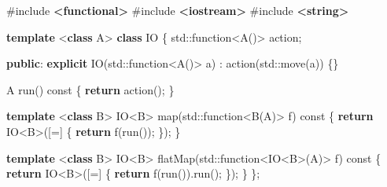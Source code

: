 \documentclass[]{article}
\newenvironment{Shaded}{}{}
\newcommand{\AttributeTok}[1]{\textcolor[rgb]{0.49,0.56,0.16}{#1}}
\newcommand{\BuiltInTok}[1]{\textcolor[rgb]{0.00,0.50,0.00}{#1}}
\newcommand{\ControlFlowTok}[1]{\textcolor[rgb]{0.00,0.44,0.13}{\textbf{#1}}}
\newcommand{\ImportTok}[1]{\textcolor[rgb]{0.00,0.50,0.00}{\textbf{#1}}}
\newcommand{\KeywordTok}[1]{\textcolor[rgb]{0.00,0.44,0.13}{\textbf{#1}}}
\newcommand{\NormalTok}[1]{#1}
\newcommand{\OperatorTok}[1]{\textcolor[rgb]{0.40,0.40,0.40}{#1}}
\newcommand{\PreprocessorTok}[1]{\textcolor[rgb]{0.74,0.48,0.00}{#1}}
\begin{document}
\begin{Shaded}
\begin{Highlighting}[]
\PreprocessorTok{\#include }\ImportTok{\textless{}functional\textgreater{}}
\PreprocessorTok{\#include }\ImportTok{\textless{}iostream\textgreater{}}
\PreprocessorTok{\#include }\ImportTok{\textless{}string\textgreater{}}

\KeywordTok{template} \OperatorTok{\textless{}}\KeywordTok{class}\NormalTok{ A}\OperatorTok{\textgreater{}}
\KeywordTok{class}\NormalTok{ IO }\OperatorTok{\{}
  \BuiltInTok{std::}\NormalTok{function}\OperatorTok{\textless{}}\NormalTok{A}\OperatorTok{()\textgreater{}}\NormalTok{ action}\OperatorTok{;}

\KeywordTok{public}\OperatorTok{:}
  \KeywordTok{explicit}\NormalTok{ IO}\OperatorTok{(}\BuiltInTok{std::}\NormalTok{function}\OperatorTok{\textless{}}\NormalTok{A}\OperatorTok{()\textgreater{}}\NormalTok{ a}\OperatorTok{)} \OperatorTok{:}\NormalTok{ action}\OperatorTok{(}\BuiltInTok{std::}\NormalTok{move}\OperatorTok{(}\NormalTok{a}\OperatorTok{))} \OperatorTok{\{\}}

\NormalTok{  A run}\OperatorTok{()} \AttributeTok{const} \OperatorTok{\{} \ControlFlowTok{return}\NormalTok{ action}\OperatorTok{();} \OperatorTok{\}}

  \KeywordTok{template} \OperatorTok{\textless{}}\KeywordTok{class}\NormalTok{ B}\OperatorTok{\textgreater{}}
\NormalTok{  IO}\OperatorTok{\textless{}}\NormalTok{B}\OperatorTok{\textgreater{}}\NormalTok{ map}\OperatorTok{(}\BuiltInTok{std::}\NormalTok{function}\OperatorTok{\textless{}}\NormalTok{B}\OperatorTok{(}\NormalTok{A}\OperatorTok{)\textgreater{}}\NormalTok{ f}\OperatorTok{)} \AttributeTok{const} \OperatorTok{\{}
    \ControlFlowTok{return}\NormalTok{ IO}\OperatorTok{\textless{}}\NormalTok{B}\OperatorTok{\textgreater{}([=]} \OperatorTok{\{} \ControlFlowTok{return}\NormalTok{ f}\OperatorTok{(}\NormalTok{run}\OperatorTok{());} \OperatorTok{\});}
  \OperatorTok{\}}

  \KeywordTok{template} \OperatorTok{\textless{}}\KeywordTok{class}\NormalTok{ B}\OperatorTok{\textgreater{}}
\NormalTok{  IO}\OperatorTok{\textless{}}\NormalTok{B}\OperatorTok{\textgreater{}}\NormalTok{ flatMap}\OperatorTok{(}\BuiltInTok{std::}\NormalTok{function}\OperatorTok{\textless{}}\NormalTok{IO}\OperatorTok{\textless{}}\NormalTok{B}\OperatorTok{\textgreater{}(}\NormalTok{A}\OperatorTok{)\textgreater{}}\NormalTok{ f}\OperatorTok{)} \AttributeTok{const} \OperatorTok{\{}
    \ControlFlowTok{return}\NormalTok{ IO}\OperatorTok{\textless{}}\NormalTok{B}\OperatorTok{\textgreater{}([=]} \OperatorTok{\{} \ControlFlowTok{return}\NormalTok{ f}\OperatorTok{(}\NormalTok{run}\OperatorTok{()).}\NormalTok{run}\OperatorTok{();} \OperatorTok{\});}
  \OperatorTok{\}}
\OperatorTok{\};}


\end{Highlighting}
\end{Shaded}
\end{document}

